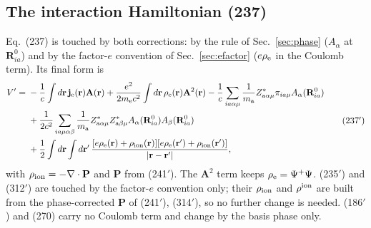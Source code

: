 \documentclass[11pt]{article}
\begin{document}
\subsection{The interaction Hamiltonian (237)}\label{sec:int-hamiltonian}
Eq.~(237) is touched by both corrections: by the rule of Sec.~\ref{sec:phase} ($A_\alpha$ at
$\mathbf R^0_{ia}$) and by the factor-$e$ convention of Sec.~\ref{sec:efactor} ($e\rho_{\rm e}$ in the
Coulomb term). Its final form is
\begin{equation*}
\begin{split}
V'={}&-\frac1c\int d\mathbf r\,\mathbf j_{\rm e}(\mathbf r)\mathbf A(\mathbf r)
+\frac{e^2}{2m_{\rm e}c^2}\int d\mathbf r\,\rho_{\rm e}(\mathbf r)\mathbf A^2(\mathbf r)
-\frac1c\sum_{ia\alpha\mu}\frac{1}{m_{\rm a}}Z^*_{{\rm a}\alpha\mu}\pi_{ia\mu}A_\alpha(\mathbf R^0_{ia})\\
&+\frac{1}{2c^2}\sum_{ia\mu\alpha\beta}\frac{1}{m_{\rm a}}Z^*_{{\rm a}\alpha\mu}Z^*_{{\rm a}\beta\mu}
A_\alpha(\mathbf R^0_{ia})A_\beta(\mathbf R^0_{ia})\\
&+\frac12\int d\mathbf r\int d\mathbf r'\,
\frac{[e\rho_{\rm e}(\mathbf r)+\rho_{\rm ion}(\mathbf r)][e\rho_{\rm e}(\mathbf r')+\rho_{\rm ion}(\mathbf r')]}
{|\mathbf r-\mathbf r'|},
\end{split}
\tag{237$'$}
\end{equation*}
with $\rho_{\rm ion}=-\nabla\cdot\mathbf P$ and $\mathbf P$ from (241$'$). The $\mathbf A^2$ term keeps
$\rho_{\rm e}=\Psi^+\Psi$. (235$'$) and (312$'$) are touched by the factor-$e$ convention only; their
$\rho_{\rm ion}$ and $\rho^{\rm ion}$ are built from the phase-corrected $\mathbf P$ of (241$'$), (314$'$), so
no further change is needed. (186$'$) and (270) carry no Coulomb term and change by the basis phase only.
\end{document}
